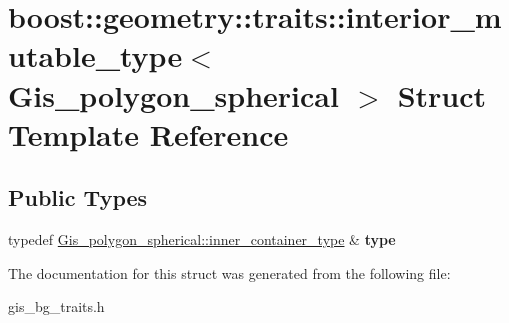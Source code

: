 \hypertarget{structboost_1_1geometry_1_1traits_1_1interior__mutable__type_3_01Gis__polygon__spherical_01_4}{}\section{boost\+:\+:geometry\+:\+:traits\+:\+:interior\+\_\+mutable\+\_\+type$<$ Gis\+\_\+polygon\+\_\+spherical $>$ Struct Template Reference}
\label{structboost_1_1geometry_1_1traits_1_1interior__mutable__type_3_01Gis__polygon__spherical_01_4}
\subsection*{Public Types}
\begin{DoxyCompactItemize}
\item 
\mbox{\label{structboost_1_1geometry_1_1traits_1_1interior__mutable__type_3_01Gis__polygon__spherical_01_4_a1068915b194cb8be9d9b4e7e283cd1f8}} 
typedef \mbox{\hyperlink{classGis__wkb__vector}{Gis\+\_\+polygon\+\_\+spherical\+::inner\+\_\+container\+\_\+type}} \& {\bfseries type}
\end{DoxyCompactItemize}


The documentation for this struct was generated from the following file\+:\begin{DoxyCompactItemize}
\item 
gis\+\_\+bg\+\_\+traits.\+h\end{DoxyCompactItemize}
